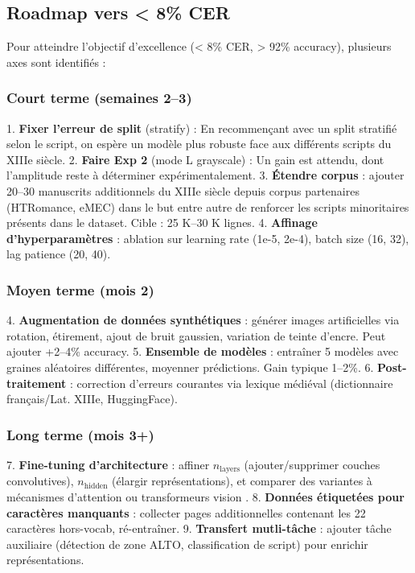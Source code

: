﻿\documentclass[twoside,twocolumn,10pt]{article}
\begin{document}
\subsection{Roadmap vers < 8\% CER}

Pour atteindre l'objectif d'excellence (< 8\% CER, > 92\% accuracy), plusieurs axes sont identifiés :

\subsubsection{Court terme (semaines 2--3)}

1. \textbf{Fixer l'erreur de split} (stratify) : En recommençant avec un split stratifié selon le script, on espère un modèle plus robuste face aux différents scripts du XIIIe siècle. 
2. \textbf{Faire Exp 2} (mode L grayscale) : Un gain est attendu, dont l'amplitude reste à déterminer expérimentalement.
3. \textbf{Étendre corpus} : ajouter 20--30 manuscrits additionnels du XIIIe siècle depuis corpus partenaires (HTRomance, eMEC) dans le but entre autre de renforcer les scripts minoritaires présents dans le dataset. Cible : 25 K--30 K lignes.
4. \textbf{Affinage d'hyperparamètres} : ablation sur learning rate (1e-5, 2e-4), batch size (16, 32), lag patience (20, 40).

\subsubsection{Moyen terme (mois 2)}

4. \textbf{Augmentation de données synthétiques} : générer images artificielles via rotation, étirement, ajout de bruit gaussien, variation de teinte d'encre. Peut ajouter +2--4\% accuracy.
5. \textbf{Ensemble de modèles} : entraîner 5 modèles avec graines aléatoires différentes, moyenner prédictions. Gain typique 1--2\%.
6. \textbf{Post-traitement} : correction d'erreurs courantes via lexique médiéval (dictionnaire français/Lat. XIIIe, HuggingFace).

\subsubsection{Long terme (mois 3+)}

7. \textbf{Fine-tuning d'architecture} : affiner $n_{\text{layers}}$ (ajouter/supprimer couches convolutives), $n_{\text{hidden}}$ (élargir représentations), et comparer des variantes à mécanismes d'attention ou transformeurs vision \cite{attention_ocr2017,arxiv_deep_learning2021}.
8. \textbf{Données étiquetées pour caractères manquants} : collecter pages additionnelles contenant les 22 caractères hors-vocab, ré-entraîner.
9. \textbf{Transfert mutli-tâche} : ajouter tâche auxiliaire (détection de zone ALTO, classification de script) pour enrichir représentations.
\end{document}
